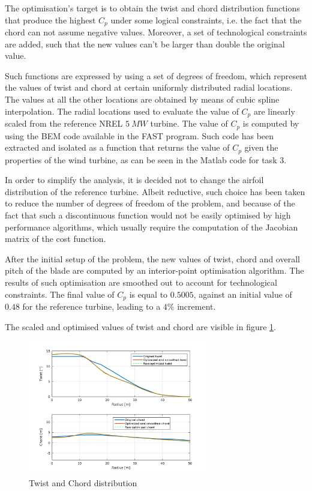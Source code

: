 The optimisation's target is to obtain the twist and chord distribution functions that produce the highest $C_p$ under some logical constraints, i.e. the fact that the chord can not assume negative values. Moreover, a set of technological constraints are added, such that the new values can't be larger than double the original value. 

Such functions are expressed by using a set of degrees of freedom, which represent the values of twist and chord at certain uniformly distributed radial locations. The values at all the other locations are obtained by means of cubic spline interpolation. The radial locations used to evaluate the value of $C_p$ are linearly scaled from the reference NREL $5\ MW$ turbine. The value of $C_p$ is computed by using the BEM code available in the FAST program. Such code has been extracted and isolated as a function that returns the value of $C_p$ given the properties of the wind turbine, as can be seen in the Matlab code for task 3.

In order to simplify the analysis, it is decided not to change the airfoil distribution of the reference turbine. Albeit reductive, such choice has been taken to reduce the number of degrees of freedom of the problem, and because of the fact that such a discontinuous function would not be easily optimised by high performance algorithms, which usually require the computation of the Jacobian matrix of the cost function.

After the initial setup of the problem, the new values of twist, chord and overall pitch of the blade are computed by an interior-point optimisation algorithm. The results of such optimisation are smoothed out to account for technological constraints. The final value of $C_p$ is equal to $0.5005$, against an initial value of $0.48$ for the reference turbine, leading to a $4\%$ increment.

The scaled and optimised values of twist and chord are visible in figure \ref{fig:twist_and_chord}.

\begin{figure}[H]
\centering
\includegraphics[width=0.7\textwidth]{Images/twist_and_chord.png} 
\caption{Twist and Chord distribution}\label{fig:twist_and_chord}
\end{figure}

